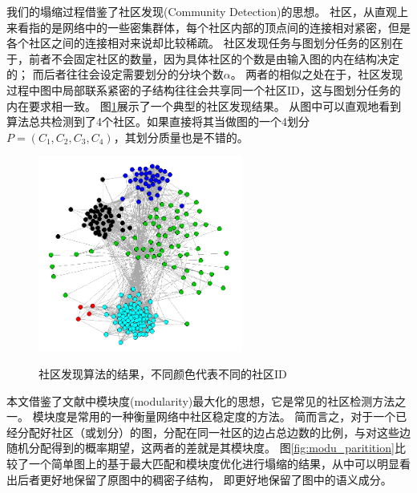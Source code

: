 \documentclass[master]{njuthesis}
\begin{document}
我们的塌缩过程借鉴了社区发现(Community Detection)的思想。
社区，从直观上来看指的是网络中的一些密集群体，每个社区内部的顶点间的连接相对紧密，但是各个社区之间的连接相对来说却比较稀疏。
社区发现任务与图划分任务的区别在于，前者不会固定社区的数量，因为具体社区的个数是由输入图的内在结构决定的；
而后者往往会设定需要划分的分块个数$\alpha$。
两者的相似之处在于，社区发现过程中图中局部联系紧密的子结构往往会共享同一个社区ID，这与图划分任务的内在要求相一致。
图\ref{fig:mlp_cd}展示了一个典型的社区发现结果。
从图中可以直观地看到算法总共检测到了4个社区。如果直接将其当做图的一个4划分$P=(C_1, C_2, C_3, C_4)$，其划分质量也是不错的。
\begin{figure}[h]
  \centering
  \includegraphics[width= 0.6\textwidth]{figure/lp.png}\\
  \caption{社区发现算法的结果，不同颜色代表不同的社区ID}
   \label{fig:mlp_cd}
\end{figure}

本文借鉴了文献\cite{newman2006modularity}中模块度(modularity)最大化的思想，它是常见的社区检测方法之一。
模块度是常用的一种衡量网络中社区稳定度的方法。
简而言之，对于一个已经分配好社区（或划分）的图，分配在同一社区的边占总边数的比例，与对这些边随机分配得到的概率期望，这两者的差就是其模块度。
图\ref{fig:modu_paritition}比较了一个简单图上的基于最大匹配和模块度优化进行塌缩的结果，从中可以明显看出后者更好地保留了原图中的稠密子结构，
即更好地保留了图中的语义成分。
\end{document}

